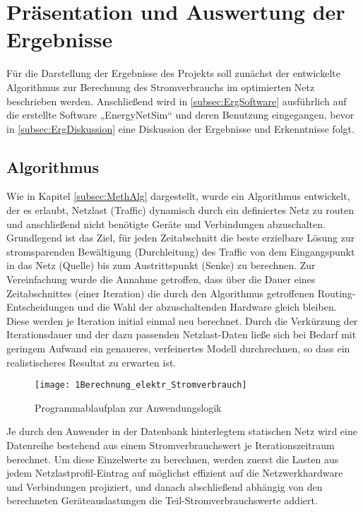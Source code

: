 
\section{Präsentation und Auswertung der Ergebnisse} \label{sec:Erg}
Für die Darstellung der Ergebnisse des Projekts soll zunächst der entwickelte Algorithmus zur Berechnung des Stromverbrauchs im optimierten Netz beschrieben werden. Anschließend wird in \ref{subsec:ErgSoftware} ausführlich auf die erstellte Software „EnergyNetSim“ und deren Benutzung eingegangen, bevor in \ref{subsec:ErgDiskussion} eine Diskussion der Ergebnisse und Erkenntnisse folgt.

\subsection{Algorithmus} \label{subsec:ErgAlg}
Wie in Kapitel \ref{subsec:MethAlg} dargestellt, wurde ein Algorithmus entwickelt, der es erlaubt, Netzlast (Traffic) dynamisch durch ein definiertes Netz zu routen und anschließend nicht benötigte Geräte und Verbindungen abzuschalten.
Grundlegend ist das Ziel, für jeden Zeitabschnitt die beste erzielbare Lösung zur stromsparenden Bewältigung (Durchleitung) des Traffic von dem Eingangspunkt in das Netz (Quelle) bis zum Austrittspunkt (Senke) zu berechnen. Zur Vereinfachung wurde die Annahme getroffen, dass über die Dauer eines Zeitabschnittes (einer Iteration) die durch den Algorithmus getroffenen Routing-Entscheidungen und die Wahl der abzuschaltenden Hardware gleich bleiben. Diese werden je Iteration initial einmal neu berechnet. Durch die Verkürzung der Iterationsdauer und der dazu passenden Netzlast-Daten ließe sich bei Bedarf mit geringem Aufwand ein genaueres, verfeinertes Modell durchrechnen, so dass ein realistischeres Resultat zu erwarten ist.


\begin{figure}[!ht]
	\centering
	\texttt{[image: 1Berechnung\_elektr\_Stromverbrauch]}
	\caption{Programmablaufplan zur Anwendungslogik}
	\label{fig:1Berechnung_elektr_Stromverbrauch}
\end{figure}


Je durch den Anwender in der Datenbank hinterlegtem statischen Netz wird eine Datenreihe bestehend aus einem Stromverbrauchswert je Iterationszeitraum berechnet.
Um diese Einzelwerte zu berechnen, werden zuerst die Lasten aus jedem Netzlastprofil-Eintrag auf möglichst effizient auf die Netzwerkhardware und Verbindungen projiziert, und danach abschließend abhängig von den berechneten Geräteauslastungen die Teil-Stromverbrauchswerte addiert.


